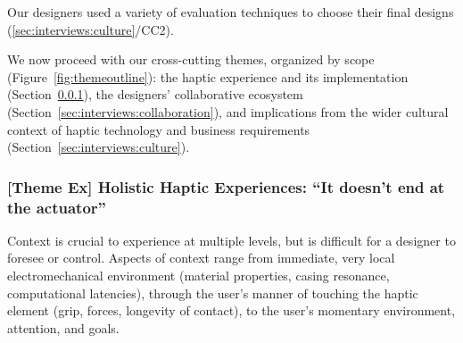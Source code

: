 Our designers used a variety of evaluation techniques to choose their final designs (\ref{sec:interviews:culture}/CC2).

We now proceed with our  cross-cutting themes, organized by scope (Figure~\ref{fig:themeoutline}): the haptic experience and its implementation (Section~\ref{sec:interviews:experience}), the designers' collaborative ecosystem (Section~\ref{sec:interviews:collaboration}), and implications from the wider cultural context of haptic technology and business requirements (Section~\ref{sec:interviews:culture}).



\subsubsection{\textbf{[Theme Ex]} Holistic Haptic Experiences: ``It doesn't end at the actuator''}
\label{sec:interviews:experience}
%
\noindent 
Context is crucial to experience at multiple levels, but is difficult for a designer to foresee or control. 
Aspects of context range from immediate, very local electromechanical environment (material properties, casing resonance, computational latencies), through the user's manner of touching the haptic element (grip, forces, longevity of contact), to the user's momentary environment, attention, and goals.

